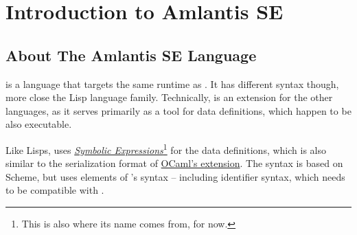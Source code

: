 
\chapter{Introduction to Amlantis SE}

\minitoc

\newpage


\section{About The Amlantis SE Language}

\AmlSE is a language that targets the same runtime as \Aml. It has different syntax though, more close the Lisp language family. Technically, \AmlSE is an extension for the other \Aml languages, as it serves primarily as a tool for data definitions, which happen to be also executable. 

Like Lisps, \AmlSE uses \href{https://en.wikipedia.org/wiki/S-expression}{{\em Symbolic Expressions}}\footnote{This is also where its name comes from, for now.} for the data definitions, which is also similar to the serialization format of \href{https://github.com/janestreet/sexplib}{OCaml's  extension}. The syntax is based on Scheme, but uses elements of \Aml's syntax -- including identifier syntax, which needs to be compatible with \Aml. 






